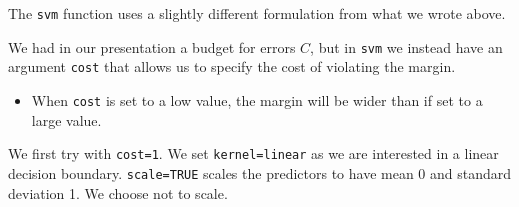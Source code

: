 \documentclass[ignorenonframetext,]{beamer}
\providecommand{\tightlist}{%
  \setlength{\itemsep}{0pt}\setlength{\parskip}{0pt}}
\begin{document}
\begin{frame}[fragile]

The \texttt{svm} function uses a slightly different formulation from
what we wrote above.

We had in our presentation a budget for errors \(C\), but in
\texttt{svm} we instead have an argument \texttt{cost} that allows us to
specify the cost of violating the margin.

\begin{itemize}
\tightlist
\item
  When \texttt{cost} is set to a low value, the margin will be wider
  than if set to a large value.
\end{itemize}

We first try with \texttt{cost=1}. We set
\texttt{kernel=\textquotesingle{}linear\textquotesingle{}} as we are
interested in a linear decision boundary. \texttt{scale=TRUE} scales the
predictors to have mean 0 and standard deviation 1. We choose not to
scale.

\end{frame}
\end{document}
